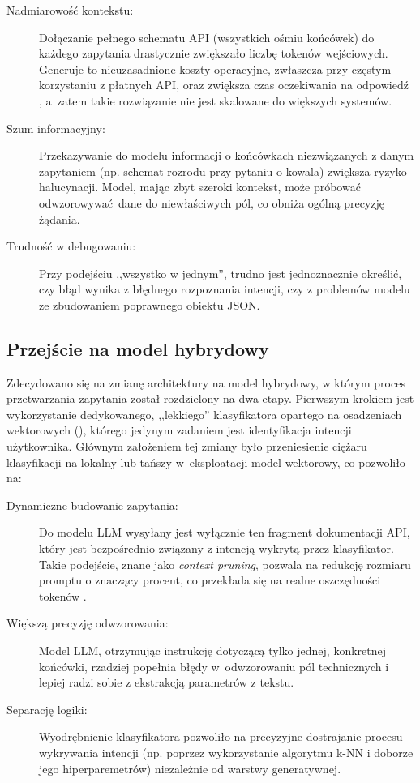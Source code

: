 \begin{description}
	\item[Nadmiarowość kontekstu:] Dołączanie pełnego schematu API (wszystkich ośmiu końcówek) do każdego zapytania drastycznie zwiększało liczbę tokenów wejściowych. Generuje to nieuzasadnione koszty operacyjne, zwłaszcza przy częstym korzystaniu z płatnych API, oraz zwiększa czas oczekiwania na odpowiedź \cite{liu2023}, a~zatem takie rozwiązanie nie jest skalowane do większych systemów.
    
	\item[Szum informacyjny:] Przekazywanie do modelu informacji o końcówkach niezwiązanych z danym zapytaniem (np. schemat rozrodu przy pytaniu o kowala) zwiększa ryzyko halucynacji. Model, mając zbyt szeroki kontekst, może próbować odwzorowywać dane do niewłaściwych pól, co obniża ogólną precyzję żądania.
    
	\item[Trudność w debugowaniu:] Przy podejściu ,,wszystko w jednym'', trudno jest jednoznacznie określić, czy błąd wynika z błędnego rozpoznania intencji, czy z problemów modelu ze zbudowaniem poprawnego obiektu JSON.
\end{description}

\subsection{Przejście na model hybrydowy}

Zdecydowano się na zmianę architektury na model hybrydowy, w którym proces przetwarzania zapytania został rozdzielony na dwa etapy. Pierwszym krokiem jest wykorzystanie dedykowanego, ,,lekkiego'' klasyfikatora opartego na osadzeniach wektorowych (), którego jedynym zadaniem jest identyfikacja intencji użytkownika.
Głównym założeniem tej zmiany było przeniesienie ciężaru klasyfikacji na lokalny lub tańszy w~eksploatacji model wektorowy, co pozwoliło na:

\begin{description}
	\item[Dynamiczne budowanie zapytania:] Do modelu LLM wysyłany jest wyłącznie ten fragment dokumentacji API, który jest bezpośrednio związany z intencją wykrytą przez klasyfikator. Takie podejście, znane jako \textit{context pruning}, pozwala na redukcję rozmiaru promptu o znaczący procent, co przekłada się na realne oszczędności tokenów \cite{jimenez2022}.
    
	\item[Większą precyzję odwzorowania:] Model LLM, otrzymując instrukcję dotyczącą tylko jednej, konkretnej końcówki, rzadziej popełnia błędy w~odwzorowaniu pól technicznych i lepiej radzi sobie z ekstrakcją parametrów z tekstu.
    
	\item[Separację logiki:] Wyodrębnienie klasyfikatora pozwoliło na precyzyjne dostrajanie procesu wykrywania intencji (np. poprzez wykorzystanie algorytmu k-NN i doborze jego hiperparemetrów) niezależnie od warstwy generatywnej.
\end{description}

